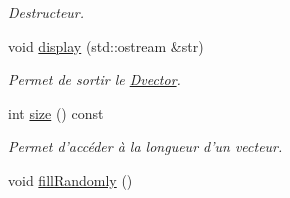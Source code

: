 \begin{DoxyCompactItemize}
\begin{DoxyCompactList}\small\item\em Destructeur. \end{DoxyCompactList}\item 
void \hyperlink{classDvector_af66e4bdf60171463c01eea1039eecdb1}{display} (std\-::ostream \&str)
\begin{DoxyCompactList}\small\item\em Permet de sortir le \hyperlink{classDvector}{Dvector}. \end{DoxyCompactList}\item 
\hypertarget{classDvector_af92b914997c31751ca7f805f63e0d543}{int \hyperlink{classDvector_af92b914997c31751ca7f805f63e0d543}{size} () const }\label{classDvector_af92b914997c31751ca7f805f63e0d543}

\begin{DoxyCompactList}\small\item\em Permet d'accéder à la longueur d'un vecteur. \end{DoxyCompactList}\item 
\hypertarget{classDvector_a6fecdca0fbad7f928403597e322234b1}{void \hyperlink{classDvector_a6fecdca0fbad7f928403597e322234b1}{fill\-Randomly} ()}\label{classDvector_a6fecdca0fbad7f928403597e322234b1}


\end{DoxyCompactItemize}
